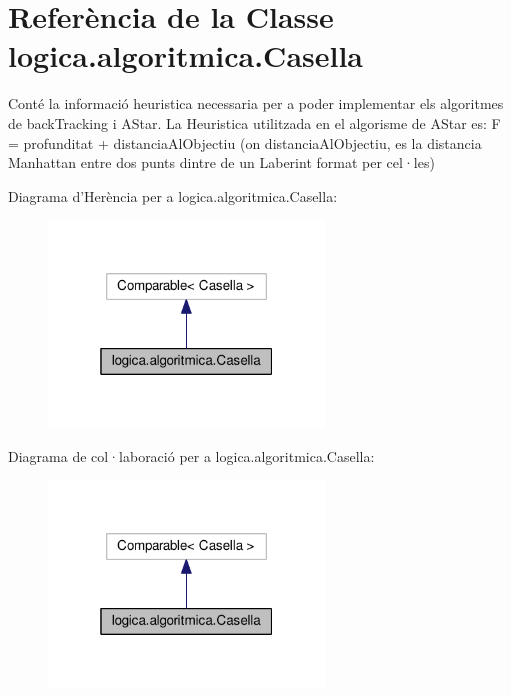 \hypertarget{classlogica_1_1algoritmica_1_1_casella}{\section{Referència de la Classe logica.\+algoritmica.\+Casella}
\label{classlogica_1_1algoritmica_1_1_casella}
}


Conté la informació heuristica necessaria per a poder implementar els algoritmes de back\+Tracking i A\+Star. La Heuristica utilitzada en el algorisme de A\+Star es\+: F = profunditat + distancia\+Al\+Objectiu (on distancia\+Al\+Objectiu, es la distancia Manhattan entre dos punts dintre de un Laberint format per cel·les)  




Diagrama d'Herència per a logica.\+algoritmica.\+Casella\+:\nopagebreak
\begin{figure}[H]
\begin{center}
\leavevmode
\includegraphics[width=208pt]{classlogica_1_1algoritmica_1_1_casella__inherit__graph}
\end{center}
\end{figure}


Diagrama de col·laboració per a logica.\+algoritmica.\+Casella\+:\nopagebreak
\begin{figure}[H]
\begin{center}
\leavevmode
\includegraphics[width=208pt]{classlogica_1_1algoritmica_1_1_casella__coll__graph}
\end{center}
\end{figure}
